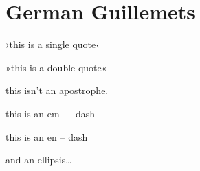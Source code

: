 
\def\mytitle{MultiMarkdown German Guillemets Test}


\part{German Guillemets}
\label{germanguillemets}

›this is a single quote‹

»this is a double quote«

this isn't an apostrophe.

this is an em --- dash

this is an en -- dash

and an ellipsis{\ldots}




